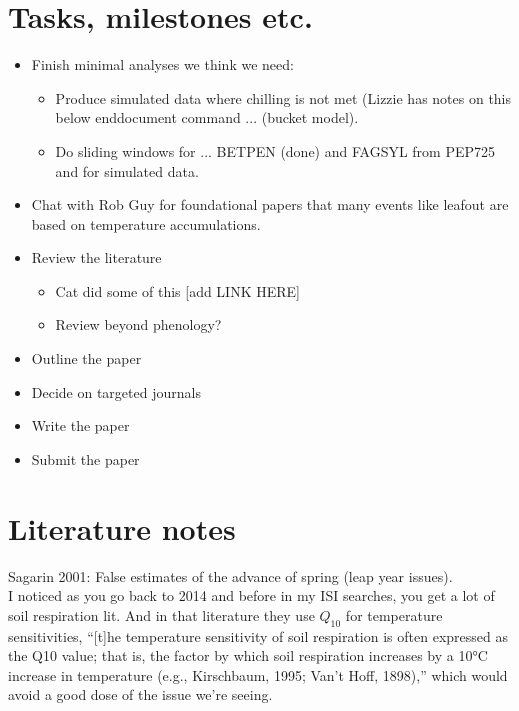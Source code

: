 \documentclass[11pt,letter]{article}
\begin{document}
\section{Tasks, milestones etc.}
\begin{itemize}
\item Finish minimal analyses we think we need:
\begin{itemize}
\item Produce simulated data where chilling is not met (Lizzie has notes on this below enddocument command ... (bucket model).
\item Do sliding windows for ... BETPEN (done) and FAGSYL from PEP725 and for simulated data.
\end{itemize}
\item Chat with Rob Guy for foundational papers that many events like leafout are based on temperature accumulations. 
\item Review the literature
\begin{itemize}
\item Cat did some of this [add LINK HERE]
\item Review beyond phenology?
\end{itemize}
\item Outline the paper
\item Decide on targeted journals
\item Write the paper
\item Submit the paper
\end{itemize}

\section{Literature notes}


Sagarin 2001: False estimates of the advance of spring (leap year issues). \\

I noticed as you go back to 2014 and before in my ISI searches, you get a lot of soil respiration lit. And in that literature they use $Q_{10}$ for temperature sensitivities, ``[t]he temperature sensitivity of soil respiration is often expressed as the Q10 value; that is, the factor by which soil respiration increases by a 10°C increase in temperature (e.g., Kirschbaum, 1995; Van't Hoff, 1898),'' which would avoid a good dose of the issue we're seeing.  %
\end{document}
